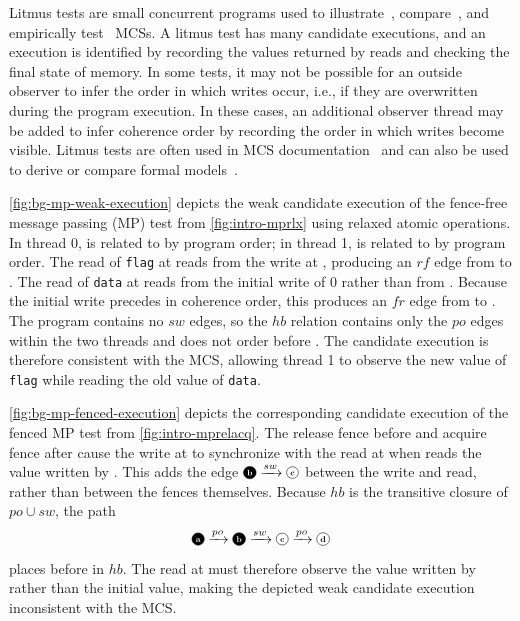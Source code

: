 Litmus tests are small concurrent programs used to illustrate~\cite{shasha1988efficient}, compare~\cite{wickerson2017automatically,madorhaim2010generating}, and empirically test~\cite{alglave2011litmus,alglave2015gpu,kirkham2020foundations} MCSs. A litmus test has many candidate executions, and an execution is identified by recording the values returned by reads and checking the final state of memory. In some tests, it may not be possible for an outside observer to infer the order in which writes occur, i.e., if they are overwritten during the program execution. In these cases, an additional observer thread may be added to infer coherence order by recording the order in which writes become visible. Litmus tests are often used in MCS documentation~\cite{batty2011mathematizing} and can also be used to derive or compare formal models~\cite{bornholt2017memsynth}.

\myfiglong\ref{fig:bg-mp-weak-execution} depicts the weak candidate execution of the fence-free message passing (MP) test from \myfig\ref{fig:intro-mprlx} using relaxed atomic operations. In thread 0, \introMpEventA is related to \introMpEventB by program order; in thread 1, \introMpEventC is related to \introMpEventD by program order. The read of \texttt{flag} at \introMpEventC reads from the write at \introMpEventB, producing an $rf$ edge from \introMpEventB to \introMpEventC. The read of \texttt{data} at \introMpEventD reads from the initial write of 0 rather than from \introMpEventA. Because the initial write precedes \introMpEventA in coherence order, this produces an $fr$ edge from \introMpEventD to \introMpEventA. The program contains no $sw$ edges, so the $hb$ relation contains only the $po$ edges within the two threads and does not order \introMpEventA before \introMpEventD. The candidate execution is therefore consistent with the MCS, allowing thread 1 to observe the new value of \texttt{flag} while reading the old value of \texttt{data}.

\myfiglong\ref{fig:bg-mp-fenced-execution} depicts the corresponding candidate execution of the fenced MP test from \myfig\ref{fig:intro-mprelacq}. The release fence before \introMpEventB and acquire fence after \introMpEventC cause the write at \introMpEventB to synchronize with the read at \introMpEventC when \introMpEventC reads the value written by \introMpEventB. This adds the edge $\introMpEventB \xrightarrow{sw} \introMpEventC$ between the write and read, rather than between the fences themselves. Because $hb$ is the transitive closure of $po \cup sw$, the path
\[
    \introMpEventA \xrightarrow{po} \introMpEventB
    \xrightarrow{sw} \introMpEventC
    \xrightarrow{po} \introMpEventD
\]
places \introMpEventA before \introMpEventD in $hb$. The read at \introMpEventD must therefore observe the value written by \introMpEventA rather than the initial value, making the depicted weak candidate execution inconsistent with the MCS.

